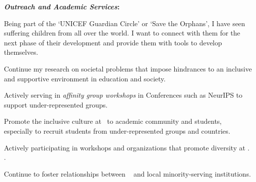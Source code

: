 \documentclass[10pt]{article}
\newcommand*\heading[1]{\textbf{\textit{#1}:}}
\begin{document}
% 

\heading{Outreach and Academic Services}
\begin{enumerate*}[leftmargin=*, noitemsep, topsep=0pt, label=(\arabic*)]
    \item Being part of the `UNICEF Guardian Circle' or `Save the Orphans', I have seen suffering children from all over the world. I want to connect with them for the next phase of their development 
    and provide them with tools to develop themselves.
    \item Continue my research on societal problems that impose hindrances to an inclusive and supportive environment in education and society. 
    \item Actively serving in \textit{affinity group workshops} in Conferences such as NeurIPS to support under-represented groups.
    \item Promote the inclusive culture at \InstitutionName ~to academic community and students, especially to recruit students from under-represented groups and countries. 
    \item Actively participating in workshops and organizations	that	promote diversity at
    \ifx\shortInstitutionName\insEmpty
        \InstitutionName{}.
    \else
        \shortInstitutionName{}.
    \fi
    \item Continue to	foster	relationships	between	\InstitutionName~ and	local minority-serving	institutions.
\end{enumerate*}
\end{document}
